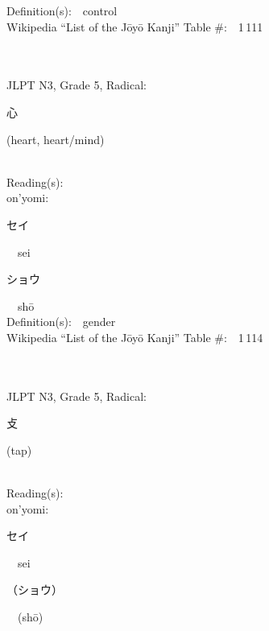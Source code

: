 \begin{multicols}{2}
Definition(s):\ \ control \\
Wikipedia ``List of the J\=oy\=o Kanji'' Table \#:\ \ 1\,111 \\
\ \ \\
{\fontsize{34pt}{40pt}  }\ \ \\  %
{JLPT N3, Grade 5, Radical:\ \ {\begin{CJK}{UTF8}{min} 心 \end{CJK}} (heart, heart/mind) } \\
Reading(s):\ \ \\
{\hspace*{1em}}on'yomi:\ \ \\
{\hspace*{2em}}{\begin{CJK}{UTF8}{min} セイ \end{CJK}}\ \ sei\ \ \\
{\hspace*{2em}}{\begin{CJK}{UTF8}{min} ショウ \end{CJK}}\ \ sh\=o\ \ \\
Definition(s):\ \ gender \\
Wikipedia ``List of the J\=oy\=o Kanji'' Table \#:\ \ 1\,114 \\
\ \ \\
{\fontsize{34pt}{40pt}  }\ \ \\  %
{JLPT N3, Grade 5, Radical:\ \ {\begin{CJK}{UTF8}{min} 攴 \end{CJK}} (tap) } \\
Reading(s):\ \ \\
{\hspace*{1em}}on'yomi:\ \ \\
{\hspace*{2em}}{\begin{CJK}{UTF8}{min} セイ \end{CJK}}\ \ sei\ \ \\
{\hspace*{2em}}{\begin{CJK}{UTF8}{min} （ショウ） \end{CJK}}\ \ (sh\=o)\ \ \\

\end{multicols}

